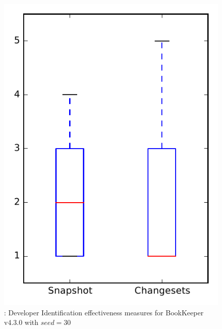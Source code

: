 
\begin{figure}
\centering
\includegraphics[height=0.4\textheight]{figures/dit_seed/rq1_bookkeeper_30}
\caption{\rtwo: Developer Identification effectiveness measures for BookKeeper v4.3.0 with $seed=30$}
\label{fig:dit_seed:rq1:bookkeeper}
\end{figure}
